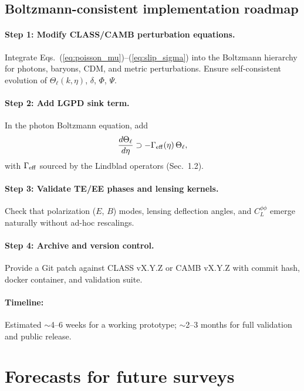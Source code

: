 \documentclass[11pt]{article}
\begin{document}
\subsection{Boltzmann-consistent implementation roadmap}

\paragraph{Step 1: Modify CLASS/CAMB perturbation equations.}
Integrate Eqs.~(\ref{eq:poisson_mu})--(\ref{eq:slip_sigma}) into the Boltzmann hierarchy for photons, baryons, CDM, and metric perturbations.
Ensure self-consistent evolution of $\Theta_\ell(k,\eta)$, $\delta$, $\Phi$, $\Psi$.

\paragraph{Step 2: Add LGPD sink term.}
In the photon Boltzmann equation, add
\begin{equation}
\frac{d\Theta_\ell}{d\eta} \supset -\Gamma_{\rm eff}(\eta)\,\Theta_\ell,
\end{equation}
with $\Gamma_{\rm eff}$ sourced by the Lindblad operators (Sec.~1.2).

\paragraph{Step 3: Validate TE/EE phases and lensing kernels.}
Check that polarization ($E$, $B$) modes, lensing deflection angles, and $C_L^{\phi\phi}$ emerge naturally without ad-hoc rescalings.

\paragraph{Step 4: Archive and version control.}
Provide a Git patch against CLASS vX.Y.Z or CAMB vX.Y.Z with commit hash, docker container, and validation suite.

\paragraph{Timeline:}
Estimated $\sim$4--6 weeks for a working prototype; $\sim$2--3 months for full validation and public release.

\section{Forecasts for future surveys}
\end{document}

